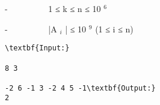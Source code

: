 -          1 ≤ k ≤ n ≤ 10   $^    6   $

   -          |A   $_    i   $   | ≤ 10   $^    9   $   (1 ≤ i ≤ n)
\begin{verbatim}
\textbf{Input:}

8 3

-2 6 -1 3 -2 4 5 -1\textbf{Output:}
2\end{verbatim}
